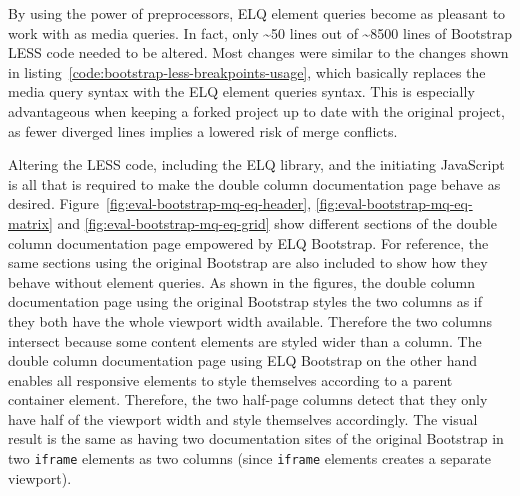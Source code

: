 \documentclass{acm_proc_article-sp}
\newcommand{\code}[1]{\texttt{#1}}
\newcommand{\gls}[1]{#1}
\begin{document}
    By using the power of preprocessors, \gls{ELQ} element queries become as pleasant to work with as \gls{media queries}.
    In fact, only \textasciitilde50 lines out of \textasciitilde8500 lines of \gls{Bootstrap} \gls{LESS} code needed to be altered.
    Most changes were similar to the changes shown in listing~\ref{code:bootstrap-less-breakpoints-usage}, which basically replaces the media query syntax with the \gls{ELQ} element queries syntax.
    This is especially advantageous when keeping a forked project up to date with the original project, as fewer diverged lines implies a lowered risk of merge conflicts.


    Altering the \gls{LESS} code, including the \gls{ELQ} library, and the initiating \gls{JavaScript} is all that is required to make the double column documentation page behave as desired.
    Figure~\ref{fig:eval-bootstrap-mq-eq-header}, \ref{fig:eval-bootstrap-mq-eq-matrix} and \ref{fig:eval-bootstrap-mq-eq-grid} show different sections of the double column documentation page empowered by \gls{ELQ} \gls{Bootstrap}.
    For reference, the same sections using the original \gls{Bootstrap} are also included to show how they behave without element queries.
    As shown in the figures, the double column documentation page using the original \gls{Bootstrap} styles the two columns as if they both have the whole \gls{viewport} width available.
    Therefore the two columns intersect because some content elements are styled wider than a column.
    The double column documentation page using \gls{ELQ} \gls{Bootstrap} on the other hand enables all \gls{responsive} elements to style themselves according to a parent container \gls{element}.
    Therefore, the two half-page columns detect that they only have half of the \gls{viewport} width and style themselves accordingly.
    The visual result is the same as having two documentation sites of the original \gls{Bootstrap} in two \code{iframe} elements as two columns (since \code{iframe} elements creates a separate \gls{viewport}).
\end{document}
